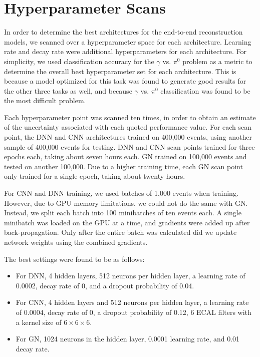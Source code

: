 \section{Hyperparameter Scans}
\label{sec:hpscan}

In order to determine the best architectures for the end-to-end reconstruction models, we scanned over a hyperparameter space for each architecture. Learning rate and decay rate were additional hyperparameters for each architecture. For simplicity, we used classification accuracy for the $\gamma$ vs. $\pi^0$ problem as a metric to determine the overall best hyperparameter set for each architecture. This is because a model optimized for this task was found to generate good results for the other three tasks as well, and because $\gamma$ vs. $\pi^0$ classification was found to be the most difficult problem.

Each hyperparameter point was scanned ten times, in order to obtain an estimate of the uncertainty associated with each quoted performance value. For each scan point, the DNN and CNN architectures trained on 400,000 events, using another sample of 400,000 events for testing. DNN and CNN scan points trained for three epochs each, taking about seven hours each. GN trained on 100,000 events and tested on another 100,000. Due to a higher training time, each GN scan point only trained for a single epoch, taking about twenty hours.

For CNN and DNN training, we used batches of 1,000 events when training. However, due to GPU memory limitations, we could not do the same with GN. Instead, we split each batch into 100 minibatches of ten events each. A single minibatch was loaded on the GPU at a time, and gradients were added up after back-propagation. Only after the entire batch was calculated did we update network weights using the combined gradients.

The best settings were found to be as follows:
\begin{itemize}
    \item For DNN, 4 hidden layers, 512 neurons per hidden layer, a learning rate of 0.0002, decay rate of 0, and a dropout probability of 0.04.
    \item For CNN, 4 hidden layers and 512 neurons per hidden layer, a learning rate of 0.0004, decay rate of 0, a dropout probability of 0.12, 6 ECAL filters with a kernel size of $6 \times 6 \times 6$.
    \item For GN, 1024 neurons in the hidden layer, 0.0001 learning rate, and 0.01 decay rate. 
\end{itemize}

